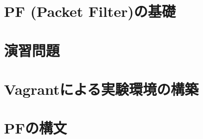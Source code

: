 \documentclass[fleqn]{jsarticle}
\begin{document}
\section{PF (Packet Filter)の基礎}

\section{演習問題} \label{sec:exercise}


\appendix

\section{Vagrantによる実験環境の構築}

\section{PFの構文}


\end{document}
